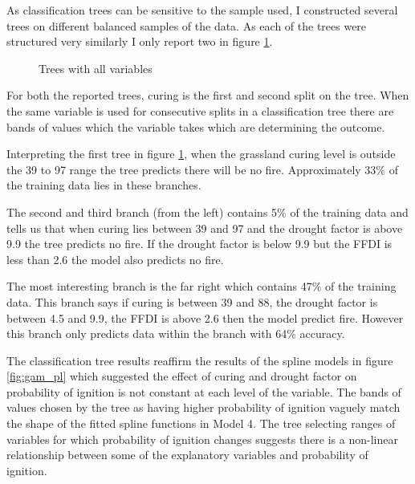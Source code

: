 \documentclass[11pt,a4paper]{article}
\begin{document}
As classification trees can be sensitive to the sample used, I constructed several trees on different balanced samples of the data. As each of the trees were structured very similarly I only report two in figure \ref{fig:tree2}. 

\begin{figure}[!ht]
	\centering 
	\caption{Trees with all variables} 
	\label{fig:tree2} 
\end{figure}

For both the reported trees, curing is the first and second split on the tree. When the same variable is used for consecutive splits in a classification tree there are bands of values which the variable takes which are determining the outcome. 

Interpreting the first tree in figure \ref{fig:tree2}, when the grassland curing level is outside the 39 to 97 range the tree predicts there will be no fire. Approximately 33\% of the training data lies in these branches. 

The second and third branch (from the left) contains 5\% of the training data and tells us that when curing lies between 39 and 97 and the drought factor is above 9.9 the tree predicts no fire. If the drought factor is below 9.9 but the FFDI is less than 2.6 the model also predicts no fire. 

The most interesting branch is the far right which contains 47\% of the training data. This branch says if curing is between 39 and 88, the drought factor is between 4.5 and 9.9, the FFDI is above 2.6 then the model predict fire. However this branch only predicts data within the branch with 64\% accuracy. 

The classification tree results reaffirm the results of the spline models in figure \ref{fig:gam_pl} which suggested the effect of curing and drought factor on probability of ignition is not constant at each level of the variable. The bands of values chosen by the tree as having higher probability of ignition vaguely match the shape of the fitted spline functions in Model 4. The tree selecting ranges of variables for which probability of ignition changes suggests there is a  non-linear relationship between some of the explanatory variables and probability of ignition. 

\end{document}
